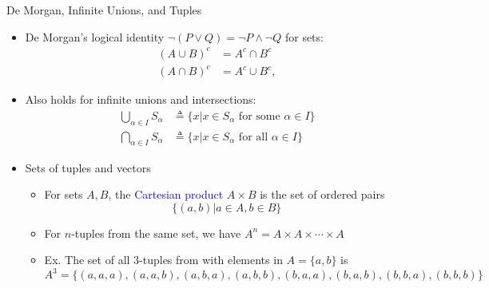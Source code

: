 \documentclass[10pt,english]{beamer}
\begin{document}
\begin{frame}{De Morgan, Infinite Unions, and Tuples}

\begin{itemize}
\setlength\itemsep{3mm}
\item<1-> De Morgan's logical identity $\neg (P \vee Q) = \neg P \wedge \neg Q$ for sets:
\begin{align*}
(A \cup B)^c & = A^c \cap B^c \\
(A \cap B)^c & = A^c \cup B^c,
\end{align*}

\item<2-> Also holds for infinite unions and intersections:
  \begin{align*}
  \bigcup_{\alpha \in I} S_{\alpha}
  &\triangleq \{ x | x \in S_{\alpha} \text{ for some } \alpha \in I \} \\
  \bigcap_{\alpha \in I} S_{\alpha}
  &\triangleq \{ x | x \in S_{\alpha} \text{ for all } \alpha \in I \} 
  \end{align*}  

\item<3-> Sets of tuples and vectors \vspace{1mm}
\begin{itemize}
  \setlength\itemsep{1.5mm}
  \item For sets $A,B$, the \textcolor{blue}{Cartesian product} $A\times B$ is the set of ordered pairs \[\{(a,b) | a\in A, b\in B\}\]
  \item For $n$-tuples from the same set, we have $A^n=A\times A \times \cdots \times A$
  \item Ex. The set of all 3-tuples from with elements in $A  = \{ a,b \}$ is
\begin{equation*}
\!\!\!\!\!\!\!\!\!\!\!\!\!\!\!\!\!\!\! A^3 = \{ (a,a,a),(a,a,b),(a,b,a),(a,b,b),(b,a,a),(b,a,b),(b,b,a),(b,b,b) \}
\end{equation*}
\end{itemize}
  
\end{itemize}
\end{frame}
\end{document}
